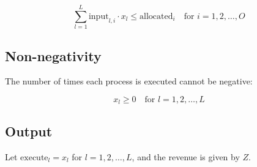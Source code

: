 \documentclass{article}
\begin{document}
\[
\sum_{l=1}^{L} \text{input}_{l,i} \cdot x_l \leq \text{allocated}_i \quad \text{for } i = 1, 2, \ldots, O
\]

\subsection*{Non-negativity}
The number of times each process is executed cannot be negative:

\[
x_l \geq 0 \quad \text{for } l = 1, 2, \ldots, L
\]

\subsection*{Output}
Let \( \text{execute}_l = x_l \) for \( l = 1, 2, \ldots, L \), and the revenue is given by \( Z \).
\end{document}
